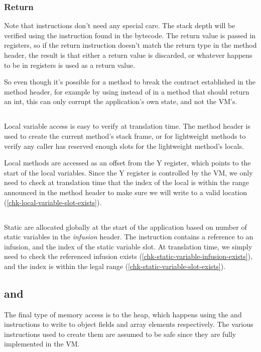 \subsubsection{Return}
Note that  instructions don't need any special care. The stack depth will be verified using the instruction found in the bytecode. The return value is passed in registers, so if the return instruction doesn't match the return type in the method header, the result is that either a return value is discarded, or whatever happens to be in registers is used as a return value.

So even though it's possible for a method to break the contract established in the method header, for example by using  instead of  in a method that should return an int, this can only corrupt the application's own state, and not the VM's.

\subsection{}
Local variable access is easy to verify at translation time. The method header is used to create the current method's stack frame, or for lightweight methods to verify any caller has reserved enough slots for the lightweight method's locals.

Local methods are accessed as an offset from the Y register, which points to the start of the local variables. Since the Y register is controlled by the VM, we only need to check at translation time that the index of the local is within the range announced in the method header to make sure we will write to a valid location (\ref{chk-local-variable-slot-exists}).

\subsection{}
Static are allocated globally at the start of the application based on number of static variables in the \emph{infusion} header. The  instruction contains a reference to an infusion, and the index of the static variable slot. At translation time, we simply need to check the referenced infusion exists (\ref{chk-static-variable-infusion-exists}), and the index is within the legal range (\ref{chk-static-variable-slot-exists}).

\subsection{ and }
The final type of memory access is to the heap, which happens using the  and  instructions to write to object fields and array elements respectively. The various  instructions used to create them are assumed to be safe since they are fully implemented in the VM.

